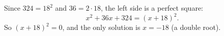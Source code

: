 Since $324=18^2$ and $36=2\cdot18$, the left side is a perfect square:
\[x^2+36x+324=(x+18)^2.\]
So $(x+18)^2=0$, and the only solution is $\boxed{x=-18}$ (a double root).
